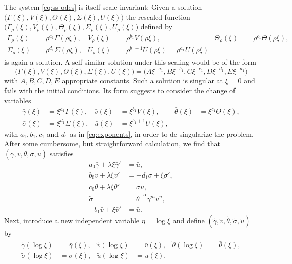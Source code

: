 \documentclass[a4paper,11pt]{article}
\def\bg{{\bar{\gamma}}}
\def\bv{{\bar{v}}}
\def\bth{{\bar{\theta}}}
\def\bs{{\bar{\sigma}}}
\def\bu{{\bar{u}}}
\def\tg{{\tilde{\gamma}}}
\def\tv{{\tilde{v}}}
\def\tth{{\tilde{\theta}}}
\def\ts{{\tilde{\sigma}}}
\def\tu{{\tilde{u}}}
\theoremstyle{remark}
\begin{document}
The system \eqref{eq:ss-odes} is itself scale invariant: Given a solution $\big(\Gamma(\xi), V(\xi), \Theta(\xi), \Sigma(\xi), U(\xi)\big)$ the rescaled
function $\big(\Gamma_\rho(\xi), V_\rho(\xi), \Theta_\rho(\xi), \Sigma_\rho(\xi), U_\rho(\xi)\big)$ defined by
\begin{equation}
\label{selfsimilardef2}
\begin{aligned}
 \Gamma_\rho(\xi)&=\rho^{a_1}\Gamma(\rho\xi), & V_\rho(\xi)&=\rho^{b_1}V(\rho\xi), & \Theta_\rho(\xi)&=\rho^{c_1}\Theta(\rho\xi),\\
 \Sigma_\rho(\xi)&=\rho^{d_1}\Sigma(\rho\xi), & U_\rho(\xi)&=\rho^{b_1+1}U(\rho\xi)=\rho^{a_1}U(\rho\xi)
\end{aligned}
\end{equation}
is again a solution. 
A self-similar solution under this scaling would be of the form
 $$\big(\Gamma(\xi), V(\xi), \Theta(\xi), \Sigma(\xi), U(\xi)\big)=\big(A\xi^{-a_1}, B\xi^{-b_1},C\xi^{-c_1},D\xi^{-d_1},E\xi^{-a_1}\big)$$ 
with $A, B, C, D, E$ appropriate constants. Such a solution is singular at $\xi =0$ and fails with the initial conditions.
Its form suggests to consider the change of variables
\begin{equation} \label{eq:CAPtoBAR}
\begin{aligned}
 \bg(\xi)&=\xi^{a_1}\Gamma(\xi), &
 \bv(\xi)&=\xi^{b_1}V(\xi), &
 \bth(\xi)&=\xi^{c_1}\Theta(\xi), \\
 \bs(\xi)&=\xi^{d_1}\Sigma(\xi), &
 \bu(\xi)&=\xi^{b_1+1}U(\xi) ,
\end{aligned}
\end{equation}
with $a_1, b_1, c_1$ and $d_1$ as in \eqref{eq:exponents}, in order to de-singularize the problem.
After some cumbersome, but straightforward calculation, we find that $(\bg,\bv,\bth,\bs,\bu)$ satisfies
\begin{equation} \label{eq:barsys}
 \begin{aligned}
  a_0\bg + \lambda\xi\bg' &=\bu,\\
  b_0\bv + \lambda\xi\bv' &=-d_1 \bs + \xi\bs',\\
  c_0\bth+ \lambda\xi\bth'&=\bs\bu,\\
  \ts &=\bth^{-\alpha}\bg^m\bu^n,\\
  -b_1\bv+\xi\bv' &= \bu.
 \end{aligned}
\end{equation}
Next, introduce a new independent variable $\eta = \log\xi$ and define $(\tg,\tv,\tth,\ts,\tu)$ by
\begin{equation} \label{eq:BARtoTIL}
\begin{aligned}
 \tg(\log\xi)&=\bg(\xi), &
 \tv(\log\xi)&=\bv(\xi), &
 \tth(\log\xi)&=\bth(\xi), \\
 \ts(\log\xi)&=\bs(\xi), &
 \tu(\log\xi)&=\bu(\xi).
\end{aligned}
\end{equation}
\end{document}
